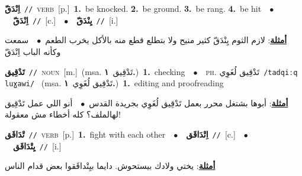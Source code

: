 \documentclass[10pt,a4paper,twoside]{article} %
\begin{document}
\begin{multicols}{2}
{\setlength\topsep{0pt}\textbf{\foreignlanguage{arabic}{اِنْدَقّ}}\ {\color{gray}\texttt{//}\color{black}}\ \textsc{verb}\ [p.]\ \textbf{1.}~be knocked.  \textbf{2.}~be ground.  \textbf{3.}~be rang.  \textbf{4.}~be hit\ \ $\bullet$\ \ \setlength\topsep{0pt}\textbf{\foreignlanguage{arabic}{اِنْدَقّ}}\ {\color{gray}\texttt{//}\color{black}}\ [c.]\ \ $\bullet$\ \ \setlength\topsep{0pt}\textbf{\foreignlanguage{arabic}{يِنْدَقّ}}\ {\color{gray}\texttt{//}\color{black}}\ [i.]\  \begin{flushright}\color{gray}\foreignlanguage{arabic}{\textbf{\underline{\foreignlanguage{arabic}{أمثلة}}}: لازم الثوم يِنْدَقّ كثير منيح ولا بتطلع قطع منه بالأكل يخرب الطعم\ $\bullet$\ \  سمعت وكأنه الباب اِنْدَقّ}\end{flushright}\color{black}} \vspace{2mm}

{\setlength\topsep{0pt}\textbf{\foreignlanguage{arabic}{تَدْقِيق}}\ {\color{gray}\texttt{//}\color{black}}\ \textsc{noun}\ [m.]\ \color{gray}(msa. \foreignlanguage{arabic}{تَدْقِيق}~\foreignlanguage{arabic}{\textbf{١.}})\color{black}\ \textbf{1.}~checking\ \ $\bullet$\ \ \textsc{ph.} \color{gray} \foreignlanguage{arabic}{تَدْقِيق لُغَوِي}\color{black}\ {\color{gray}\texttt{/{\sffamily tadqiːq luɣawi}/}\color{black}}\ \color{gray} (msa. \foreignlanguage{arabic}{تَدْقِيق لُغَوِي}~\foreignlanguage{arabic}{\textbf{١.}})\color{black}\ \textbf{1.}~editing and proofreading\  \begin{flushright}\color{gray}\foreignlanguage{arabic}{\textbf{\underline{\foreignlanguage{arabic}{أمثلة}}}: أبوها بشتغل محرر بعمل تَدْقِيق لُغَوِي بجريدة القدس\ $\bullet$\ \  أنو اللي عمل تَدْقِيق لهالملف؟ كله أخطاء مش معقولة!}\end{flushright}\color{black}} \vspace{2mm}

{\setlength\topsep{0pt}\textbf{\foreignlanguage{arabic}{تْدَاقَق}}\ {\color{gray}\texttt{//}\color{black}}\ \textsc{verb}\ [p.]\ \textbf{1.}~fight with each other\ \ $\bullet$\ \ \setlength\topsep{0pt}\textbf{\foreignlanguage{arabic}{اِتْدَاقَق}}\ {\color{gray}\texttt{//}\color{black}}\ [c.]\ \ $\bullet$\ \ \setlength\topsep{0pt}\textbf{\foreignlanguage{arabic}{يِتْدَاقَق}}\ {\color{gray}\texttt{//}\color{black}}\ [i.]\  \begin{flushright}\color{gray}\foreignlanguage{arabic}{\textbf{\underline{\foreignlanguage{arabic}{أمثلة}}}: يختي ولادك بيستحوش. دايما بيِتْداقَقوا بعض قدام الناس}\end{flushright}\color{black}} \vspace{2mm}


\end{multicols}
\end{document}
